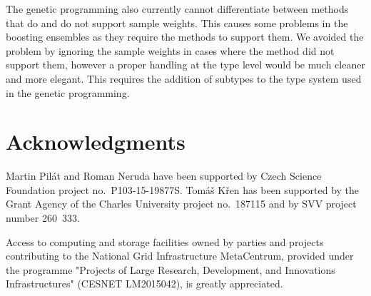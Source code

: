 \documentclass{ws-ijait}
\begin{document}
The genetic programming also currently cannot differentiate between methods that
do and do not support sample weights. This causes some problems in the boosting
ensembles as they require the methods to support them. We avoided the problem by
ignoring the sample weights in cases where the method did not support them,
however a proper handling at the type level would be much cleaner and more
elegant. This requires the addition of subtypes to the type system used in the 
genetic programming.

\section*{Acknowledgments}

Martin Pil\'{a}t and Roman Neruda have been supported by Czech Science
Foundation project no.~P103-15-19877S. Tom\'a\v{s} K\v{r}en has been supported
by the Grant Agency of the Charles University project no.~187115 and by SVV
project number 260~333.

Access to computing and storage facilities owned by parties and projects
contributing to the National Grid Infrastructure MetaCentrum, provided under the
programme "Projects of Large Research, Development, and Innovations
Infrastructures" (CESNET LM2015042), is greatly appreciated.



\end{document}
